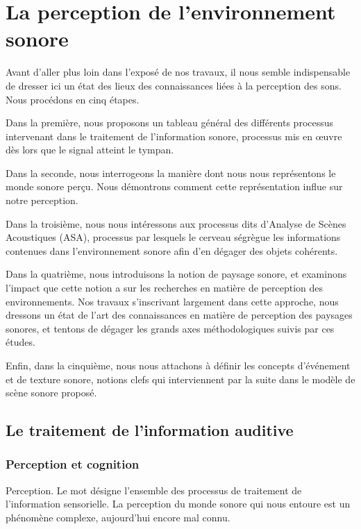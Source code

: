 \chapter{La perception de l'environnement sonore}\label{ch:psycho_ea}


Avant d'aller plus loin dans l'exposé de nos travaux, il nous semble indispensable de dresser ici un état des lieux des connaissances liées à la perception des sons. Nous procédons en cinq étapes. 

Dans la première, nous proposons un tableau général des différents processus intervenant dans le traitement de l'information sonore, processus mis en œuvre dès lors que le signal atteint le tympan. 

Dans la seconde, nous interrogeons la manière dont nous nous représentons le monde sonore perçu. Nous démontrons comment cette représentation influe sur notre perception. 

Dans la troisième, nous nous intéressons aux processus dits d'Analyse de Scènes Acoustiques (ASA), processus par lesquels le cerveau ségrègue les informations contenues dans l'environnement sonore afin d'en dégager des objets cohérents. 

Dans la quatrième, nous introduisons la notion de paysage sonore, et examinons l'impact que cette notion a sur les recherches en matière de perception des environnements. Nos travaux s'inscrivant largement dans cette approche, nous dressons un état de l'art des connaissances en matière de perception des paysages sonores, et tentons de dégager les grands axes méthodologiques suivis par ces études.

Enfin, dans la cinquième, nous nous attachons à définir les concepts d'événement et de texture sonore, notions clefs qui interviennent par la suite dans le modèle de scène sonore proposé.

\section{Le traitement de l'information auditive}

\subsection{Perception et cognition}

Perception. Le mot désigne l'ensemble des processus de traitement de l'information sensorielle. 
La perception du monde sonore qui nous entoure est un phénomène complexe, aujourd'hui encore mal connu. 

